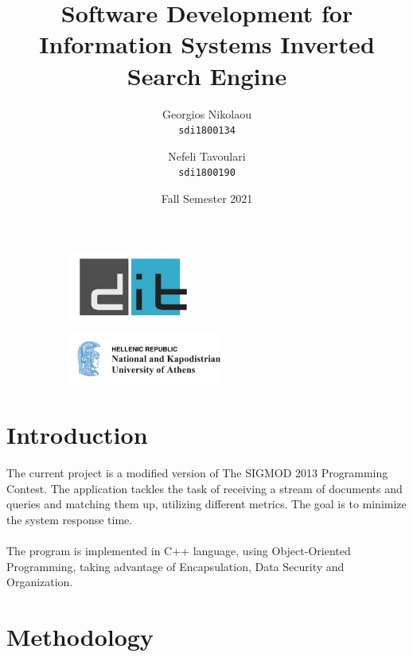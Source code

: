 \documentclass{article}
\title{%
\HUGE
Software Development for Information Systems \LARGE Inverted Search Engine}
\begin{document}
\author{\Large
  Georgios Nikolaou\\
   \texttt{\large sdi1800134}
  \and
  \Large
  Nefeli Tavoulari\\
   \texttt{\large sdi1800190}
}
\date{Fall Semester 2021}
\maketitle
\begin{figure}
\centering
\begin{subfigure}
  \centering
  \includegraphics[width=40mm]{dit_logo}
  \label{fig:sub1}
\end{subfigure}%
\begin{subfigure}
  \centering
  \includegraphics[width=50mm]{NKUA_logo}
  \label{fig:sub2}
\end{subfigure}
\label{fig:test}
\end{figure}


\newpage
\tableofcontents
\newpage
\section{Introduction} \large
The current project is a modified version of The SIGMOD 2013 Programming Contest.
The application tackles the task of receiving a stream of documents and queries and matching them up, utilizing different metrics.
The goal is to minimize the system response time. \\ \\
The program is implemented in C++ language, using Object-Oriented Programming, taking advantage of Encapsulation, Data Security and Organization.
\section{Methodology}
\end{document}
